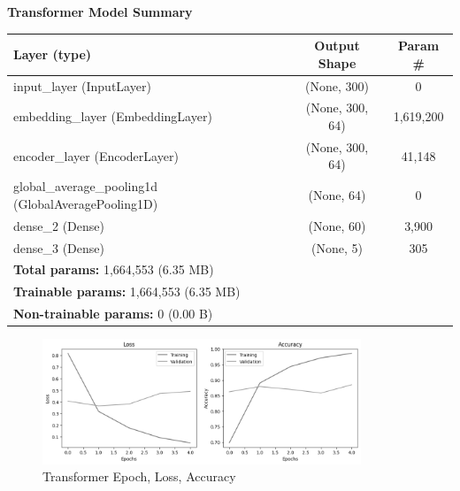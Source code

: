 \vspace{-1cm}

\begin{center}
    \textbf{Transformer Model Summary} \\[0.5em]
    \begin{tabular}{|l|c|c|}
        \hline
        \rowcolor{gray!20}
        \textbf{Layer (type)} & \textbf{Output Shape} & \textbf{Param \#} \\ \hline
        input\_layer (InputLayer) & (None, 300) & 0 \\ \hline
        embedding\_layer (EmbeddingLayer) & (None, 300, 64) & \textcolor{green!50!black}{1,619,200} \\ \hline
        encoder\_layer (EncoderLayer) & (None, 300, 64) & \textcolor{green!50!black}{41,148} \\ \hline
        global\_average\_pooling1d (GlobalAveragePooling1D) & (None, 64) & 0 \\ \hline
        dense\_2 (Dense) & (None, 60) & \textcolor{green!50!black}{3,900} \\ \hline
        dense\_3 (Dense) & (None, 5) & \textcolor{green!50!black}{305} \\ \hline
        \multicolumn{3}{|l|}{\textbf{Total params:} \textcolor{green!50!black}{1,664,553 (6.35 MB)}} \\ \hline
        \multicolumn{3}{|l|}{\textbf{Trainable params:} \textcolor{green!50!black}{1,664,553 (6.35 MB)}} \\ \hline
        \multicolumn{3}{|l|}{\textbf{Non-trainable params:} \textcolor{green!50!black}{0 (0.00 B)}} \\ \hline
    \end{tabular}
\end{center}

\vspace{-0.5cm}

\begin{figure}[h!]  
    \centering
    \includegraphics[width=0.85\textwidth]{Images/T LOSS EPOCH.png}  
    \caption{Transformer Epoch, Loss, Accuracy}
    \label{lstm t epch}  %
\end{figure}


